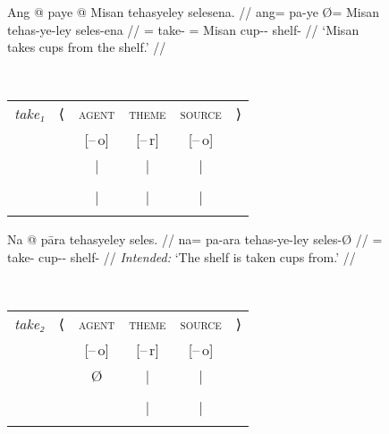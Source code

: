 \begin{figure}
\setlength{\tabcolsep}{.5ex}
\pex\label{ex:derargpass}
\a\label{ex:derargpass_1}%
\begin{minipage}[t]{.55\remaining}
\begingl
	\gla Ang @ paye {} @ Misan tehasyeley selesena. //
	\glb ang= pa-ye Ø= Misan tehas-ye-ley seles-ena //
	\glc \AgtT{}= take-\TsgF{} \Top{}= Misan cup-\Pl{}-\PargI{} shelf-\Gen{} //
	\glft `Misan takes cups from the shelf.' //
\endgl
\end{minipage}
~
\begin{tabular}[t]{>{\itshape}l l c c c r}
take₁
	& ⟨
	& \textsc{agent}
	& \textsc{theme}
	& \textsc{source}
	& ⟩
	\\
%
	& %
	& [–\,o]
	& [–\,r]
	& [–\,o]
	& %
	\\

%
	& %
	& |
	& |
	& |
	& %
	\\

%
	& %
	& \Subj
	& \Obj
	& \Oblq{src}
	& %
	\\

%
	& %
	& |
	& |
	& |
	& %
	\\

%
	& %
	& \fw{Misan}
	& \fw{cups}
	& \fw{shelf}
	& %
	\\
\end{tabular}

\a\label{ex:derargpass_2}\ljudge*%
\begin{minipage}[t]{.55\remaining}%
\begingl
	\gla Na @ pāra tehasyeley seles. //
	\glb na= pa-ara tehas-ye-ley seles-Ø //
	\glc \GenT{}= take-\TsgI{} cup-\Pl{}-\PargI{} shelf-\Top{} //
	\glft \textit{Intended:} `The shelf is taken cups from.' //
\endgl
\end{minipage}
~
\begin{tabular}[t]{>{\itshape}l l c c c r}
take₂
	& ⟨
	& \textsc{agent}
	& \textsc{theme}
	& \textsc{source}
	& ⟩
	\\
%
	& %
	& [–\,o]
	& [–\,r]
	& [–\,o]
	& %
	\\

%
	& %
	& Ø
	& |
	& |
	& %
	\\

%
	& %
	& %
	& \Obj
	& \Subj
	& %
	\\

%
	& %
	& %
	& |
	& |
	& %
	\\

%
	& %
	& %
	& \fw{cups}
	& \fw{shelf}
	& %
	\\
\end{tabular}


\end{figure}
